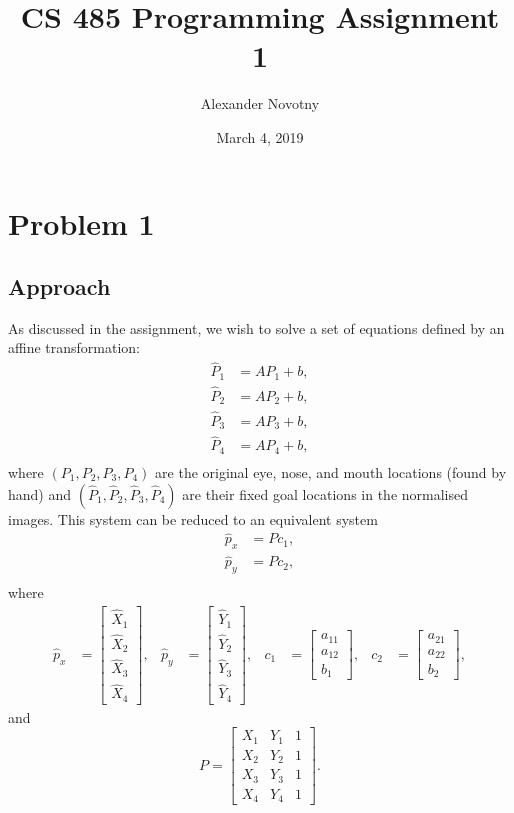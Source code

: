\documentclass[dvipsnames]{article}
\title{CS 485 Programming Assignment 1}
\date{March 4, 2019}
\author{Alexander Novotny}
\begin{document}

\maketitle

\section*{Problem 1}
\subsection*{Approach}
As discussed in the assignment, we wish to solve a set of equations defined by an affine transformation:
\begin{align*}
	\hat{P}_1 &= AP_1 + b,\\
	\hat{P}_2 &= AP_2 + b,\\
	\hat{P}_3 &= AP_3 + b,\\
	\hat{P}_4 &= AP_4 + b,\\
\end{align*}
where $(P_1, P_2, P_3, P_4)$ are the original eye, nose, and mouth locations (found by hand) and $(\hat{P}_1, \hat{P}_2, \hat{P}_3, \hat{P}_4)$ are their fixed goal locations in the normalised images. This system can be reduced to an equivalent system
\begin{align*}
	\hat{p}_x &= Pc_1,\\
	\hat{p}_y &= Pc_2,\\
\end{align*}
where
\begin{align*}
	\hat{p}_x &= \begin{bmatrix}\hat{X}_1\\\hat{X}_2\\\hat{X}_3\\\hat{X}_4\end{bmatrix}, &
	\hat{p}_y &= \begin{bmatrix}\hat{Y}_1\\\hat{Y}_2\\\hat{Y}_3\\\hat{Y}_4\end{bmatrix}, &
	c_1 &= \begin{bmatrix}a_{11}\\a_{12}\\b_1\end{bmatrix}, &
	c_2 &= \begin{bmatrix}a_{21}\\a_{22}\\b_2\end{bmatrix},
\end{align*}
and
\[
	P =
	\begin{bmatrix}
		X_1 & Y_1 & 1\\
		X_2 & Y_2 & 1\\
		X_3 & Y_3 & 1\\
		X_4 & Y_4 & 1
	\end{bmatrix}.
\]
\end{document}

